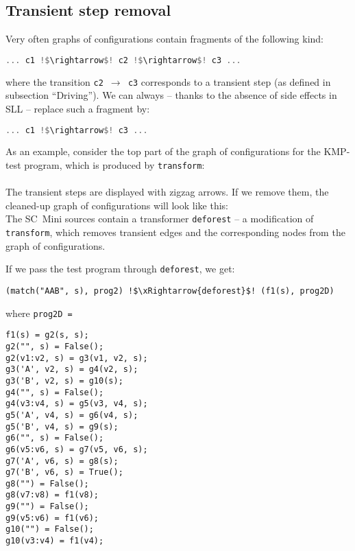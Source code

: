 \subsection{Transient step removal}

Very often graphs of configurations contain fragments of the following kind:
\begin{lstlisting}[language=haskell,escapechar=!]
... c1 !$\rightarrow$! c2 !$\rightarrow$! c3 ...
\end{lstlisting}
where the transition \texttt{c2 $\rightarrow$ c3} corresponds to a transient step 
(as defined in subsection ``Driving'').
We can always -- thanks to the absence of side effects in SLL -- replace such a fragment by:
\begin{lstlisting}[language=haskell,escapechar=!]
... c1 !$\rightarrow$! c3 ...
\end{lstlisting}

As an example, consider the top part of the graph of configurations 
for the KMP-test program, which is produced by 
\texttt{transform}:\\
\\
The transient steps are displayed with zigzag arrows.
If we remove them, the cleaned-up graph of configurations will look like this:\\


The SC~Mini sources contain a transformer \texttt{deforest} -- a modification
of \texttt{transform}, which removes transient edges and the corresponding nodes
from the graph of configurations.

If we pass the test program through \texttt{deforest}, we get:
\begin{lstlisting}[language=sll,escapechar=!]
(match("AAB", s), prog2) !$\xRightarrow{deforest}$! (f1(s), prog2D)
\end{lstlisting}
where \texttt{prog2D = }
\begin{lstlisting}[language=sll]
f1(s) = g2(s, s);
g2("", s) = False();
g2(v1:v2, s) = g3(v1, v2, s);
g3('A', v2, s) = g4(v2, s);
g3('B', v2, s) = g10(s);
g4("", s) = False();
g4(v3:v4, s) = g5(v3, v4, s);
g5('A', v4, s) = g6(v4, s);
g5('B', v4, s) = g9(s);
g6("", s) = False();
g6(v5:v6, s) = g7(v5, v6, s);
g7('A', v6, s) = g8(s);
g7('B', v6, s) = True();
g8("") = False();
g8(v7:v8) = f1(v8);
g9("") = False();
g9(v5:v6) = f1(v6);
g10("") = False();
g10(v3:v4) = f1(v4);
\end{lstlisting}

